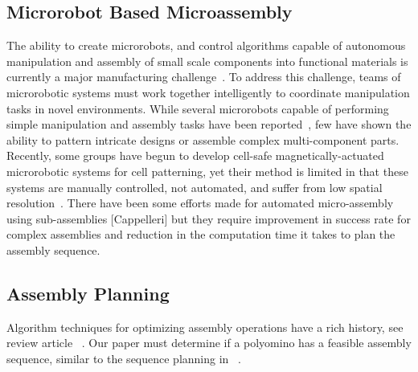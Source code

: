 \subsection{Microrobot Based Microassembly}
The ability to create microrobots, and control algorithms capable of autonomous manipulation and assembly of small scale components into functional materials is currently a major manufacturing challenge~\cite{chang2005therapeutic}. 
To address this challenge, teams of microrobotic systems must work together intelligently to coordinate manipulation tasks in novel environments. 
While several microrobots capable of performing simple manipulation and assembly tasks have been reported~\cite{prakash2007artificial,chang2007artificial,weibel2007microfabrication,abbott2007robotics,yi2006microfluidics,castillo2009manipulation}, few have shown the ability to pattern intricate designs or assemble complex multi-component parts. 
Recently, some groups have begun to develop cell-safe magnetically-actuated microrobotic systems for cell patterning, yet their method is limited in that these systems are manually controlled, not automated, and suffer from low spatial resolution~\cite{tasoglu2014untethered,tasoglu2014guided}. 
There have been some efforts made for automated micro-assembly using sub-assemblies [Cappelleri] but they require improvement in success rate for complex assemblies and reduction in the computation time it takes to plan the assembly sequence.


\subsection{Assembly Planning}
Algorithm techniques for optimizing assembly operations have a rich history, see review article ~\cite{rashid2012review}.
Our paper must determine if a polyomino has a feasible assembly sequence, similar to the sequence planning in ~\cite{Su2007}.





 
